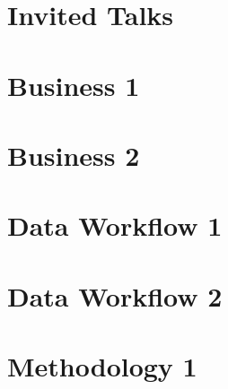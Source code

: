 \documentclass[11pt,oneside]{book}
\begin{document}
\mainmatter

\pagestyle{mainmatter}%

\chapter{Invited Talks}











\chapter{Business 1}

% 




\chapter{Business 2}






\chapter{Data Workflow 1}






\chapter{Data Workflow 2}





\chapter{Methodology 1}



\end{document}
